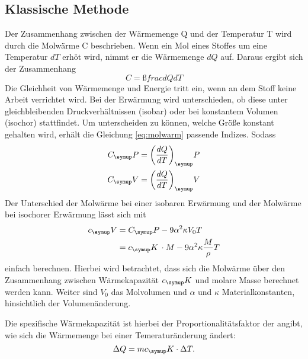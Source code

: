 \subsection{Klassische Methode}
Der Zusammenhang zwischen der Wärmemenge Q und der Temperatur T wird durch die
Molwärme C beschrieben. Wenn ein Mol eines Stoffes um eine Temperatur $dT$
erhöt wird, nimmt er die Wärmemenge $dQ$ auf. Daraus ergibt sich der
Zusammenhang
\begin{equation}
  C=ßfrac{dQ}{dT}
  \label{eq:molwarm}
\end{equation}
Die Gleichheit von Wärmemenge und Energie tritt ein, wenn an dem Stoff keine
Arbeit verrichtet wird.
Bei der Erwärmung wird unterschieden, ob diese unter gleichbleibenden
Druckverhältnissen (isobar) oder bei konstantem Volumen (isochor) stattfindet.
Um unterscheiden zu können, welche Größe konstant gehalten wird, erhält die
Gleichung \eqref{eq:molwarm} passende Indizes. Sodass
\begin{equation}
\begin{split}
  C_\su{P}&=\biggl(\frac{dQ}{dT}\biggr)_\su{P} \\
  C_\su{V}&=\biggl(\frac{dQ}{dT}\biggr)_\su{V}
  \label{eq:index}
\end{split}
\end{equation}
Der Unterschied der Molwärme bei einer isobaren Erwärmung und der Molwärme bei
isochorer Erwärmung lässt sich mit
\begin{equation}
\begin{split}
  c_\su{V}&= C_\su{P}-9\alpha^2\kappa V_0 T \\
  &= c_\su{K}\,\cdot M - 9\alpha^2\kappa\frac{M}{\rho}T
  \label{eq:molwarm2}
\end{split}
\end{equation}
einfach berechnen. Hierbei wird betrachtet, dass sich die Molwärme über den
Zusammenhang zwischen Wärmekapazität $c_\su{K}$ und molare Masse berechnet
werden kann. Weiter sind $V_0$ das Molvolumen und $\alpha$ und $\kappa$
Materialkonstanten, hinsichtlich der Volumenänderung.

Die spezifische Wärmekapazität ist hierbei der Proportionalitätsfaktor der
angibt, wie sich die Wärmemenge bei einer Temeraturänderung ändert:
\begin{equation}
  \Delta Q = mc_\su{K}\cdot\Delta T.
\end{equation}


